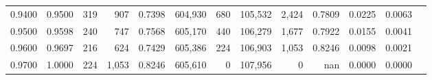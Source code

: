 \begin{tabular}{rrrrrrrrrrrrr}
0.9400 & 0.9500 &    319 &   907 &                                     0.7398 & 604,930 &     680 & 105,532 &   2,424 & 0.7809 & 0.0225 & 0.0063 \\
0.9500 & 0.9598 &    240 &   747 &                                     0.7568 & 605,170 &     440 & 106,279 &   1,677 & 0.7922 & 0.0155 & 0.0041 \\
0.9600 & 0.9697 &    216 &   624 &                                     0.7429 & 605,386 &     224 & 106,903 &   1,053 & 0.8246 & 0.0098 & 0.0021 \\
0.9700 & 1.0000 &    224 & 1,053 &                                     0.8246 & 605,610 &       0 & 107,956 &       0 &    nan & 0.0000 & 0.0000 \\
\bottomrule
\end{tabular}
